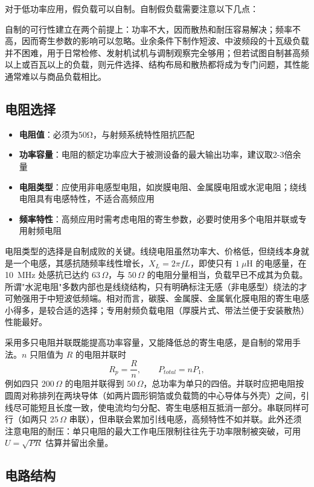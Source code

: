 对于低功率应用，假负载可以自制。自制假负载需要注意以下几点：

自制的可行性建立在两个前提上：功率不大，因而散热和耐压容易解决；频率不高，因而寄生参数的影响可以忽略。业余条件下制作短波、中波频段的十瓦级负载并不困难，用于日常检修、发射机试机与调制观察完全够用；但若试图自制甚高频以上或百瓦以上的负载，则元件选择、结构布局和散热都将成为专门问题，其性能通常难以与商品负载相比。

\subsection{电阻选择}

\begin{itemize}
    \item \textbf{电阻值}：必须为50Ω，与射频系统特性阻抗匹配
    \item \textbf{功率容量}：电阻的额定功率应大于被测设备的最大输出功率，建议取2-3倍余量
    \item \textbf{电阻类型}：应使用非电感型电阻，如炭膜电阻、金属膜电阻或水泥电阻；绕线电阻具有电感特性，不适合高频应用
    \item \textbf{频率特性}：高频应用时需考虑电阻的寄生参数，必要时使用多个电阻并联或专用射频电阻
\end{itemize}

电阻类型的选择是自制成败的关键。线绕电阻虽然功率大、价格低，但绕线本身就是一个电感，其感抗随频率线性增长，$X_L = 2\pi f L$，即使只有 $1\ \mu\mathrm{H}$ 的电感量，在 10~MHz 处感抗已达约 $63\,\Omega$，与 $50\,\Omega$ 的电阻分量相当，负载早已不成其为负载。所谓"水泥电阻"多数内部也是线绕结构，只有明确标注无感（非电感型）绕法的才可勉强用于中短波低频端。相对而言，碳膜、金属膜、金属氧化膜电阻的寄生电感小得多，是较合适的选择；专用射频负载电阻（厚膜片式、带法兰便于安装散热）性能最好。

采用多只电阻并联既能提高功率容量，又能降低总的寄生电感，是自制的常用手法。$n$ 只阻值为 $R$ 的电阻并联时
\[
R_p = \frac{R}{n}, \qquad P_{total} = n P_1,
\]
例如四只 $200\,\Omega$ 的电阻并联得到 $50\,\Omega$，总功率为单只的四倍。并联时应把电阻按圆周对称排列在两块导体（如两片圆形铜箔或负载筒的中心导体与外壳）之间，引线尽可能短且长度一致，使电流均匀分配、寄生电感相互抵消一部分。串联同样可行（如两只 $25\,\Omega$ 串联），但串联会累加引线电感，高频特性不如并联。此外还须注意电阻的耐压：单只电阻的最大工作电压限制往往先于功率限制被突破，可用 $U = \sqrt{P R}$ 估算并留出余量。

\subsection{电路结构}

